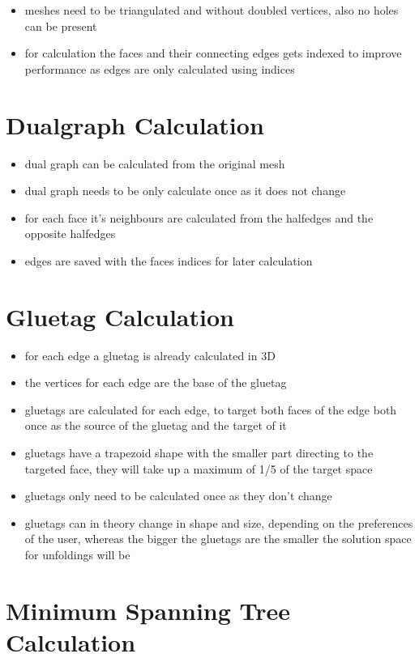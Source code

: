 \documentclass[draft,final]{vutinfth} %
\begin{document}
\begin{itemize}
	\item meshes need to be triangulated and without doubled vertices, also no holes can be present
	\item for calculation the faces and their connecting edges gets indexed to improve performance as edges are only calculated using indices
\end{itemize}

\section{Dualgraph Calculation}

\begin{itemize}
	\item dual graph can be calculated from the original mesh 
	\item dual graph needs to be only calculate once as it does not change
	\item for each face it's neighbours are calculated from the halfedges and the opposite halfedges
	\item edges are saved with the faces indices for later calculation
\end{itemize}

\section{Gluetag Calculation}

\begin{itemize}
	\item for each edge a gluetag is already calculated in 3D
	\item the vertices for each edge are the base of the gluetag
	\item gluetags are calculated for each edge, to target both faces of the edge both once as the source of the gluetag and the target of it
	\item gluetags have a trapezoid shape with the smaller part directing to the targeted face, they will take up a maximum of 1/5 of the target space
	\item gluetags only need to be calculated once as they don't change
	\item gluetags can in theory change in shape and size, depending on the preferences of the user, whereas the bigger the gluetags are the smaller the solution space for unfoldings will be
\end{itemize}

\section{Minimum Spanning Tree Calculation}
\end{document}
